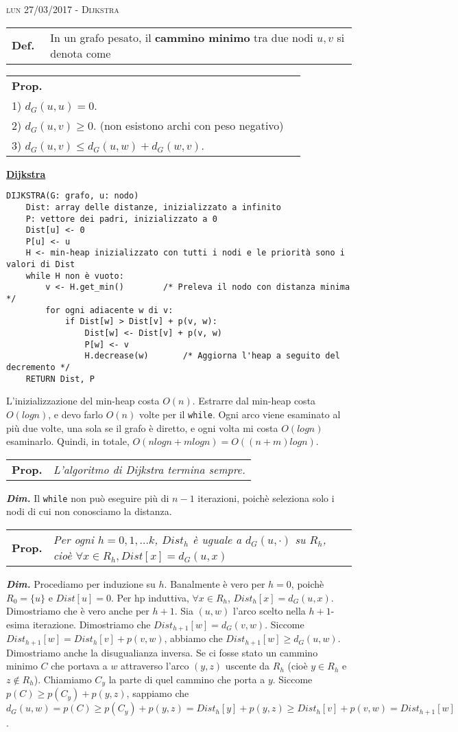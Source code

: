 \documentclass[a4paper,10pt]{article} %
\newcommand{\dimo}[1]{%
    \smallbreak \par \hfill\begin{minipage}{0.92\linewidth}{ \scriptsize {\textbf{\em{Dim.}}} {#1} }\end{minipage} \smallskip \par}
\newcommand{\malgorithm}[1]{%
    {\bigbreak \par \hspace*{4pt} \underline{\textbf {#1}}}}
\newcommand{\msection}[1]{%
    {\newpage\bigbreak \bigbreak \par \hfil \huge \textsc {#1}}\par}
\renewcommand{\b}[1]{%
    {\textbf{#1}}}
\renewcommand{\t}[1]{%
    {\texttt{#1}}}
\newcommand{\mdef}[1]{%
    {\smallbreak\par\begin{tabular}{ll} \textbf{Def.$\;\;$} & \begin{minipage}[t]{0.80\columnwidth}\normalsize  {#1}\end{minipage}\tabularnewline \end{tabular}}\smallskip\par}
\newcommand{\mprop}[1]{%
    {\smallbreak\par\begin{tabular}{ll} \textbf{Prop.} & \begin{minipage}[t]{0.8\columnwidth}\emph  {#1}\end{minipage}\tabularnewline \end{tabular}}\smallskip\par}
\begin{document}
\msection{lun 27/03/2017 - Dijkstra}



\mdef{In un grafo pesato, il \b{cammino minimo} tra due nodi $u,v$ si denota come \boldmath{$d_G(u,v)$}}

\mprop{In un grafo pesato valgono le seguenti proprietà:\\
        1) $d_G(u,u) = 0$.\\
        2) $d_G(u,v) \geq 0$. (non esistono archi con peso negativo)\\
        3) $d_G(u,v) \leq d_G(u,w) + d_G(w,v).$}

\malgorithm{Dijkstra}
\begin{lstlisting}
DIJKSTRA(G: grafo, u: nodo)
    Dist: array delle distanze, inizializzato a infinito
    P: vettore dei padri, inizializzato a 0
    Dist[u] <- 0
    P[u] <- u
    H <- min-heap inizializzato con tutti i nodi e le priorità sono i valori di Dist
    while H non è vuoto:
        v <- H.get_min()        /* Preleva il nodo con distanza minima */
        for ogni adiacente w di v:
            if Dist[w] > Dist[v] + p(v, w):
                Dist[w] <- Dist[v] + p(v, w)
                P[w] <- v
                H.decrease(w)       /* Aggiorna l'heap a seguito del decremento */
    RETURN Dist, P
\end{lstlisting}

L'inizializzazione del min-heap costa $O(n)$. Estrarre dal min-heap costa $O(logn)$, e devo farlo $O(n)$ volte per il \t{while}. Ogni arco viene esaminato al più due volte, una sola se il grafo è diretto, e ogni volta mi costa $O(logn)$ esaminarlo. Quindi, in totale, $O(nlogn + mlogn) = O((n + m)logn)$.

\mprop{L'algoritmo di Dijkstra termina sempre.}
\dimo{Il \t{while} non può eseguire più di $n-1$ iterazioni, poichè seleziona solo i nodi di cui non conosciamo la distanza.}

\mprop{Per ogni $h = 0,1,\ldots k$, $Dist_h$ è uguale a $d_G(u,\cdot)$ su $R_h$, cioè $\forall x \in R_h, Dist[x] = d_G(u,x)$}

\dimo{
    Procediamo per induzione su $h$. Banalmente è vero per $h = 0$, poichè $R_0 = \{u\}$ e $Dist[u] = 0$.
    Per hp induttiva, $\forall x \in R_h$, $Dist_h[x] = d_G(u,x)$.   Dimostriamo che è vero anche per $h + 1$. Sia $(u,w)$ l'arco scelto nella $h + 1$-esima iterazione. Dimostriamo che $Dist_{h+1}[w] = d_G(v,w)$. Siccome $Dist_{h+1}[w] = Dist_h[v] + p(v,w)$, abbiamo che $Dist_{h+1}[w] \geq d_G(u,w)$. Dimostriamo anche la disugualianza inversa. Se ci fosse stato un cammino minimo $C$ che portava a $w$ attraverso l'arco $(y,z)$ uscente da $R_h$ (cioè $y \in R_h$ e $z \not \in R_h$). Chiamiamo $C_y$ la parte di quel cammino che porta a $y$. Siccome $p(C) \geq p(C_y) + p(y,z)$, sappiamo che $d_G(u,w) = p(C) \geq p(C_y) + p(y,z) = Dist_h[y] + p(y,z) \geq Dist_h[v] + p(v,w) = Dist_{h+1}[w]$.
}
\end{document}
